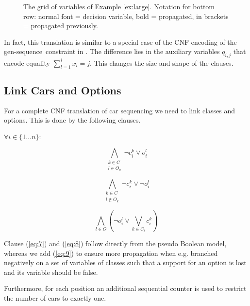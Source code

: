 \documentclass[]{llncs}
\def\constraint#1{\mbox{{\rm\sc #1} }}
\def\gseq{{\constraint{gen-sequence}}}
\begin{document}
\begin{figure}
\centering 
\caption{The grid of variables of Example \ref{ex:large}. Notation for bottom row: normal font = decision variable, bold
= propagated, in brackets = propagated previously.}


\label{fig3}
\end{figure}

In fact, this translation is similar to a special case of the CNF encoding of the \gseq constraint in \cite{Bacchus07}.
The difference lies in the auxiliary variables $q_{i,j}$ that encode equality $\sum_{l=1}^i x_l = j$. This changes the
size and shape of the clauses. 

\subsection{Link Cars and Options}
\label{sub:link}

For a complete CNF translation of car sequencing we need to link classes and options. This is done by the following
clauses. 

$\forall i\in \{1\ldots n\}$: 

\begin{equation} \label{eq:7}
     \bigwedge_{\substack{k \in C \\ l \in O_k }} \neg c^k_{i} \vee o^l_{i}
\end{equation}

\begin{equation} \label{eq:8}
    \bigwedge_{\substack{k \in C \\ l \not \in O_k}} \neg c^k_{i} \vee \neg o^l_{i}
\end{equation}

\begin{equation} \label{eq:9}
    \bigwedge_{l\in O} \left(\neg o^l_{i} \vee \bigvee_{k \in C_l} c^k_{i}\right)
\end{equation}

Clause (\ref{eq:7}) and (\ref{eq:8}) follow directly from the pseudo Boolean model, whereas we add (\ref{eq:9}) to
ensure more propagation when e.g. branched negatively on a set of variables of classes such that a support for an
option is lost and its variable should be false.

Furthermore, for each position an additional sequential counter is used to restrict the number of cars to exactly one. 

%
\end{document}

